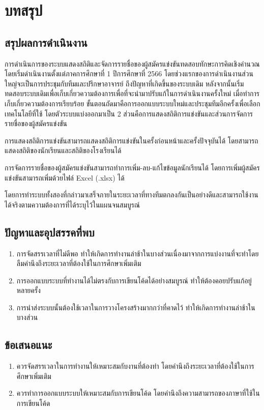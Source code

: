 \chapter{บทสรุป}
\label{chapter:conclusion}

\section{สรุปผลการดำเนินงาน}

การดำเนินการของระบบแสดงสถิติและจัดการรายชื่อของผู้สมัครแข่งขันทดสอบทักษะการคิดเชิงคำนวณ โดยเริ่มดำเนินงานตั้งแต่ภาคการศึกษาที่ 1 ปีการศึกษาที่ 2566 โดยช่วงแรกของการดำเนินงานส่วนใหญ่จะเป็นการประชุมกับทีมและปรึกษาอาจารย์ ถึงปัญหาที่เกิดขึ้นของระบบเดิม หลังจากนั้นเริ่มทดสอบระบบเดิมเพื่อเก็บเกี่ยวความต้องการเพื่อที่จะนำมาปรับแก้ในการดำเนินงานครั้งใหม่ เมื่อทำการเก็บเกี่ยวความต้องการเรียบร้อย ขั้นตอนถัดมาคือการออกแบบระบบใหม่และประชุมทีมอีกครั้งเพื่อเลือกเทคโนโลยีที่ใช้ โดยตัวระบบแบ่งออกมาเป็น 2 ส่วนคือการแสดงสถิติการแข่งขันและส่วนการจัดการรายชื่อของผู้สมัครแข่งขัน

การแสดงสถิติการแข่งขันสามารถแสดงสถิติการแข่งขันในครั้งก่อนหน้าและครั้งปัจจุบันได้ โดยสามารถแสดงสถิติของนักเรียนและสถิติของโรงเรียนได้ 

การจัดการรายชื่อของผู้สมัครแข่งขันสามารถทำการเพิ่ม-ลบ-แก้ไขข้อมูลนักเรียนได้ โดยการเพิ่มผู้สมัครแข่งขันสามารถเพิ่มด้วยไฟล์ Excel (.xlsx) ได้

โดยการทำระบบทั้งสองที่กล่าวมาเสร็จภายในระยะเวลาที่ทางทีมตกลงกันเป็นอย่างดีและสามารถใช้งานได้จริงตามความต้องการที่ได้ระบุไว้ในแผนจนสมบูรณ์

\section{ปัญหาและอุปสรรคที่พบ}

\begin{enumerate}
    \item การจัดสรรเวลาที่ไม่ดีพอ ทำให้เกิดการทำงานล่าช้าในบางส่วนเนื่องมาจากการแบ่งงานที่จะทำโดยลืมคำนึงถึงระยะเวลาที่ต้องใช้ในการศึกษาเพิ่มเติม
    \item การออกแบบระบบที่ทำงานได้ไม่ตรงกับการเขียนโค้ดได้อย่างสมบูรณ์ ทำให้ต้องคอยปรับแก้อยู่หลายครั้ง
    \item การนำส่งระบบนั้นต้องใช้เวลาในการวางโครงสร้างมากกว่าที่คาดไว้ ทำให้เกิดการทำงานล่าช้าในบางส่วน
\end{enumerate}

\section{ข้อเสนอแนะ}

\begin{enumerate}
    \item ควรจัดสรรเวลาในการทำงานให้เหมาะสมกับงานที่ต้องทำ โดยคำนึงถึงระยะเวลาที่ต้องใช้ในการศึกษาเพิ่มเติม
    \item ควรทำการออกแบบระบบให้เหมาะสมกับการเขียนโค้ด โดยคำนึงถึงความสามารถของภาษาที่ใช้ในการเขียนโค้ด
\end{enumerate}